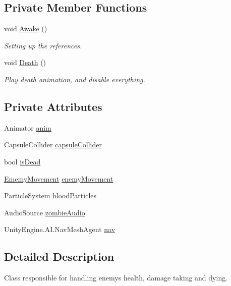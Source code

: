 \subsection*{Private Member Functions}
\begin{DoxyCompactItemize}
\item 
void \mbox{\hyperlink{class_enemy_health_a39b183a0c0642fdb1d1e56b63ed77d41}{Awake}} ()
\begin{DoxyCompactList}\small\item\em Setting up the references. \end{DoxyCompactList}\item 
void \mbox{\hyperlink{class_enemy_health_a74d777b866036ad554de39776cf46429}{Death}} ()
\begin{DoxyCompactList}\small\item\em Play death animation, and disable everything. \end{DoxyCompactList}\end{DoxyCompactItemize}
\subsection*{Private Attributes}
\begin{DoxyCompactItemize}
\item 
Animator \mbox{\hyperlink{class_enemy_health_a87ac641128bbd5abf5db6cc3f7bf9a87}{anim}}
\item 
Capsule\+Collider \mbox{\hyperlink{class_enemy_health_acf69b8ae9a92c09beea9f41d1aef78b1}{capsule\+Collider}}
\item 
bool \mbox{\hyperlink{class_enemy_health_a7427764b86c5b76f00f217deea84e36f}{is\+Dead}}
\item 
\mbox{\hyperlink{class_ememy_movement}{Ememy\+Movement}} \mbox{\hyperlink{class_enemy_health_acacabe545a46ea6ff5cc4bf4cb43e388}{enemy\+Movement}}
\item 
Particle\+System \mbox{\hyperlink{class_enemy_health_a1999eda4199231ee458052e6fca2f6bc}{blood\+Particles}}
\item 
Audio\+Source \mbox{\hyperlink{class_enemy_health_a2004b2007b08fd455886109e50078c6d}{zombie\+Audio}}
\item 
Unity\+Engine.\+A\+I.\+Nav\+Mesh\+Agent \mbox{\hyperlink{class_enemy_health_a8b4b47104cb36f0d93666435750965bb}{nav}}
\end{DoxyCompactItemize}


\subsection{Detailed Description}
Class responsible for handling enemy\textquotesingle{}s health, damage taking and dying. 

